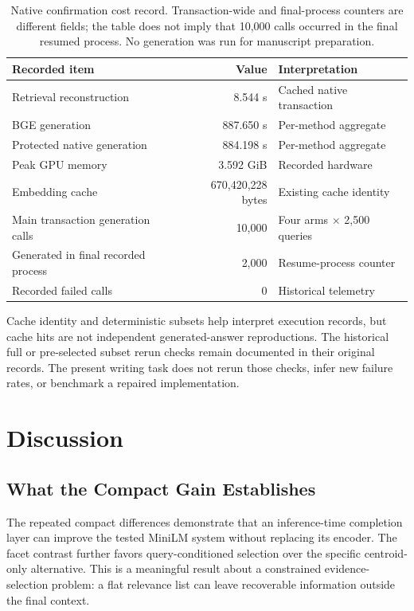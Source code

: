 \documentclass[11pt,a4paper]{article}
\begin{document}
\begin{table}[t]
\centering\small
\begin{tabular}{@{}p{}rp{}@{}}
\toprule
Recorded item & Value & Interpretation\\
\midrule
Retrieval reconstruction & 8.544 s & Cached native transaction\\
BGE generation & 887.650 s & Per-method aggregate\\
Protected native generation & 884.198 s & Per-method aggregate\\
Peak GPU memory & 3.592 GiB & Recorded hardware\\
Embedding cache & 670,420,228 bytes & Existing cache identity\\
Main transaction generation calls & 10,000 & Four arms $\times$ 2,500 queries\\
Generated in final recorded process & 2,000 & Resume-process counter\\
Recorded failed calls & 0 & Historical telemetry\\
\bottomrule
\end{tabular}
\caption{Native confirmation cost record. Transaction-wide and final-process
counters are different fields; the table does not imply that 10,000 calls
occurred in the final resumed process. No generation was run for manuscript
preparation.}
\label{tab:cost}
\end{table}

Cache identity and deterministic subsets help interpret execution records,
but cache hits are not independent generated-answer reproductions. The
historical full or pre-selected subset rerun checks remain documented in
their original records. The present writing task does not rerun those
checks, infer new failure rates, or benchmark a repaired implementation.

\section{Discussion}
\subsection{What the Compact Gain Establishes}
The repeated compact differences demonstrate that an inference-time
completion layer can improve the tested MiniLM system without replacing
its encoder. The facet contrast further favors query-conditioned selection
over the specific centroid-only alternative. This is a meaningful result
about a constrained evidence-selection problem: a flat relevance list can
leave recoverable information outside the final context.
\end{document}
